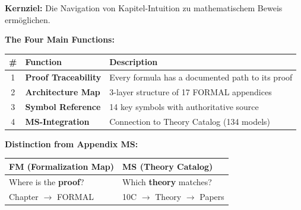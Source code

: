 \begin{tcolorbox}[colback=blue!5!white, colframe=blue!75!black,
    title=\textbf{Core Objective: Navigation from Intuition to Proof}]

\textbf{Kernziel:} Die Navigation von Kapitel-Intuition zu mathematischem Beweis ermöglichen.

\begin{center}
\end{center}

\vspace{0.5em}
\textbf{The Four Main Functions:}

\begin{center}
\begin{tabular}{|c|l|l|}
\hline
\textbf{\#} & \textbf{Function} & \textbf{Description} \\
\hline
\hline
1 & \textbf{Proof Traceability} & Every formula has a documented path to its proof \\
2 & \textbf{Architecture Map} & 3-layer structure of 17 FORMAL appendices \\
3 & \textbf{Symbol Reference} & 14 key symbols with authoritative source \\
4 & \textbf{MS-Integration} & Connection to Theory Catalog (134 models) \\
\hline
\end{tabular}
\end{center}

\vspace{0.5em}
\textbf{Distinction from Appendix MS:}

\begin{center}
\begin{tabular}{|l|l|}
\hline
\textbf{FM (Formalization Map)} & \textbf{MS (Theory Catalog)} \\
\hline
\hline
Where is the \textbf{proof}? & Which \textbf{theory} matches? \\
Chapter $\rightarrow$ FORMAL & 10C $\rightarrow$ Theory $\rightarrow$ Papers \\
\hline
\end{tabular}
\end{center}

\end{tcolorbox}

